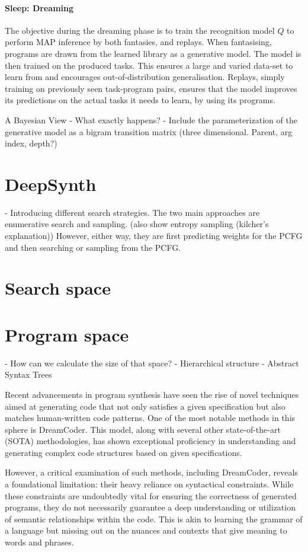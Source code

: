 \paragraph{Sleep: Dreaming} The objective during the dreaming phase is to train the recognition model $Q$ to perform MAP inference by both fantasies, and replays. When fantasising, programs are drawn from the learned library as a generative model. The model is then trained on the produced tasks. This ensures a large and varied data-set to learn from and encourages out-of-distribution generalisation. Replays, simply training on previously seen task-program pairs, ensures that the model improves its predictions on the actual tasks it needs to learn, by using its programs.

A Bayesian View
- What exactly happens?
- Include the parameterization of the generative model as a bigram transition matrix (three dimensional. Parent, arg index, depth?)


\section{DeepSynth}
- Introducing different search strategies.
The two main approaches are enumerative search and sampling. (also show entropy sampling (kilcher's explanation))
However, either way, they are first predicting weights for the PCFG and then searching or sampling from the PCFG. 
\section{Search space}
\section{Program space}
- How can we calculate the size of that space?
- Hierarchical structure 
- Abstract Syntax Trees


Recent advancements in program synthesis have seen the rise of novel techniques aimed at generating code that not only satisfies a given specification but also matches human-written code patterns. One of the most notable methods in this sphere is DreamCoder. This model, along with several other state-of-the-art (SOTA) methodologies, has shown exceptional proficiency in understanding and generating complex code structures based on given specifications.

However, a critical examination of such methods, including DreamCoder, reveals a foundational limitation: their heavy reliance on syntactical constraints. While these constraints are undoubtedly vital for ensuring the correctness of generated programs, they do not necessarily guarantee a deep understanding or utilization of semantic relationships within the code. This is akin to learning the grammar of a language but missing out on the nuances and contexts that give meaning to words and phrases.

